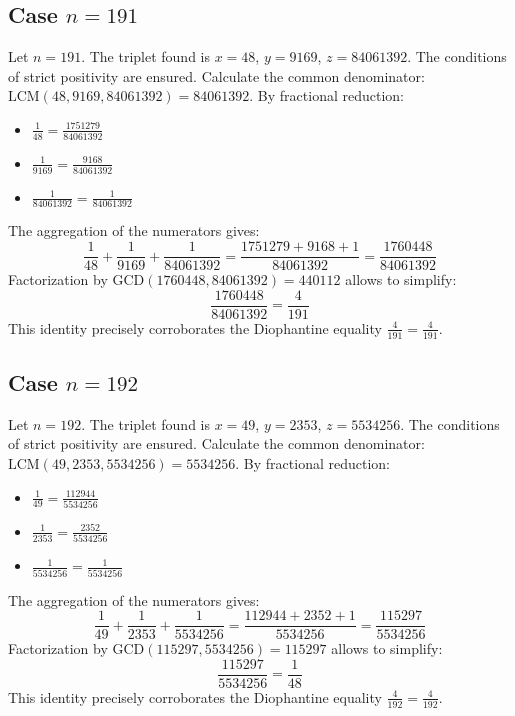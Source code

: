 \documentclass[11pt,a4paper]{article}
\begin{document}
\subsection{Case $n = 191$}
Let $n = 191$. The triplet found is $x = 48$, $y = 9169$, $z = 84061392$.
The conditions of strict positivity are ensured.
Calculate the common denominator: $\text{LCM}(48, 9169, 84061392) = 84061392$.
By fractional reduction:
\begin{itemize}
    \item $\frac{1}{48} = \frac{1751279}{84061392}$
    \item $\frac{1}{9169} = \frac{9168}{84061392}$
    \item $\frac{1}{84061392} = \frac{1}{84061392}$
\end{itemize}
The aggregation of the numerators gives:
$$ \frac{1}{48} + \frac{1}{9169} + \frac{1}{84061392} = \frac{1751279 + 9168 + 1}{84061392} = \frac{1760448}{84061392} $$
Factorization by $\text{GCD}(1760448, 84061392) = 440112$ allows to simplify:
$$ \frac{1760448}{84061392} = \frac{4}{191} $$
This identity precisely corroborates the Diophantine equality $\frac{4}{191} = \frac{4}{191}$.

\subsection{Case $n = 192$}
Let $n = 192$. The triplet found is $x = 49$, $y = 2353$, $z = 5534256$.
The conditions of strict positivity are ensured.
Calculate the common denominator: $\text{LCM}(49, 2353, 5534256) = 5534256$.
By fractional reduction:
\begin{itemize}
    \item $\frac{1}{49} = \frac{112944}{5534256}$
    \item $\frac{1}{2353} = \frac{2352}{5534256}$
    \item $\frac{1}{5534256} = \frac{1}{5534256}$
\end{itemize}
The aggregation of the numerators gives:
$$ \frac{1}{49} + \frac{1}{2353} + \frac{1}{5534256} = \frac{112944 + 2352 + 1}{5534256} = \frac{115297}{5534256} $$
Factorization by $\text{GCD}(115297, 5534256) = 115297$ allows to simplify:
$$ \frac{115297}{5534256} = \frac{1}{48} $$
This identity precisely corroborates the Diophantine equality $\frac{4}{192} = \frac{4}{192}$.
\end{document}
